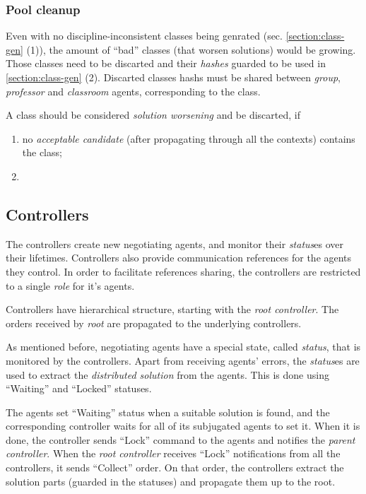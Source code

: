 \subsubsection{Pool cleanup}
\label{section:clean-pool}

Even with no discipline-inconsistent classes being genrated
(sec. \ref{section:class-gen} (1)), the amount of
``bad'' classes (that worsen solutions) would be growing.
Those classes need to be discarted and their \emph{hashes} guarded
to be used in \ref{section:class-gen} (2). Discarted classes hashs must be
shared between \emph{group}, \emph{professor} and \emph{classroom} agents,
corresponding to the class.

A class should be considered \emph{solution worsening} and be discarted, if
\begin{enumerate}
  \item no \emph{acceptable candidate} (after propagating through all the contexts)
    contains the class;
  \item {}
\end{enumerate}







\subsection{Controllers}

The controllers create new negotiating agents, and monitor their \emph{status}es
over their lifetimes. Controllers also provide communication references for the
agents they control. In order to facilitate references sharing, the controllers
are restricted to a single \emph{role} for it's agents.

Controllers have hierarchical structure, starting with the \emph{root
  controller}. The orders received by \emph{root} are propagated to
the underlying controllers.

\medskip

As mentioned before, negotiating agents have a special state,
called \emph{status}, that is monitored by the controllers. Apart
from receiving agents' errors, the \emph{status}es are used to
extract the \emph{distributed solution} from the agents.
This is done using ``Waiting'' and ``Locked'' statuses.

The agents set ``Waiting'' status when a suitable solution is found,
and the corresponding controller waits for all of its subjugated
agents to set it. When it is done, the controller sends ``Lock''
command to the agents and notifies the \emph{parent controller}.
When the \emph{root controller} receives ``Lock'' notifications from
all the controllers, it sends ``Collect'' order. On that order, the controllers
extract the solution parts (guarded in the statuses) and propagate them up to
the root.
